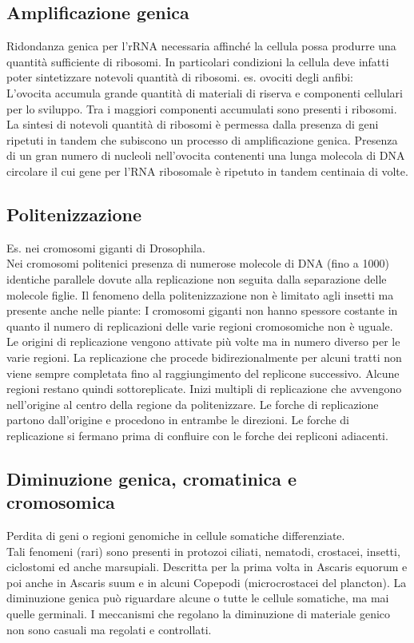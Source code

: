 \documentclass{article}
\begin{document}
\subsection{Amplificazione genica}
Ridondanza genica per l'rRNA necessaria affinché la cellula possa produrre una quantità sufficiente di ribosomi. In particolari condizioni la cellula deve infatti poter sintetizzare notevoli quantità di
ribosomi. es. ovociti degli anfibi:\\
L'ovocita accumula grande quantità di materiali di riserva e componenti cellulari per lo
sviluppo. Tra i maggiori componenti accumulati sono presenti i ribosomi. \\
La sintesi di notevoli quantità di ribosomi è permessa dalla presenza di geni ripetuti in
tandem che subiscono un processo di amplificazione genica. Presenza di un gran numero di nucleoli nell'ovocita contenenti una lunga molecola di DNA
circolare il cui gene per l'RNA ribosomale è ripetuto in tandem centinaia di volte.
\subsection{Politenizzazione}
Es. nei cromosomi giganti di Drosophila.\\
Nei cromosomi politenici presenza di numerose molecole di DNA (fino a 1000) identiche parallele dovute alla replicazione
non seguita dalla separazione delle molecole figlie. Il fenomeno della politenizzazione non è limitato agli insetti ma presente anche nelle piante: I cromosomi giganti non hanno spessore costante in quanto il numero
di replicazioni delle varie regioni cromosomiche non è uguale.\\
Le origini di replicazione vengono attivate più volte ma in numero diverso per le varie regioni. La replicazione che procede bidirezionalmente per alcuni tratti non viene
sempre completata fino al raggiungimento del replicone successivo. Alcune regioni restano quindi sottoreplicate. Inizi multipli di replicazione che avvengono nell'origine al centro della regione da politenizzare. Le forche di
replicazione partono dall'origine e procedono in entrambe le direzioni. Le forche di replicazione si fermano prima di
confluire con le forche dei repliconi adiacenti. 
\subsection{Diminuzione genica, cromatinica e cromosomica}
Perdita di geni o regioni genomiche in cellule somatiche differenziate.\\
Tali fenomeni (rari) sono presenti in protozoi ciliati, nematodi, crostacei, insetti, ciclostomi ed anche marsupiali. Descritta per la prima volta in Ascaris equorum e poi anche in Ascaris suum e in alcuni
Copepodi (microcrostacei del plancton). La diminuzione genica può riguardare alcune o tutte le cellule somatiche, ma mai quelle germinali. I meccanismi che regolano la diminuzione di materiale genico non sono casuali ma regolati e controllati.
\end{document}

